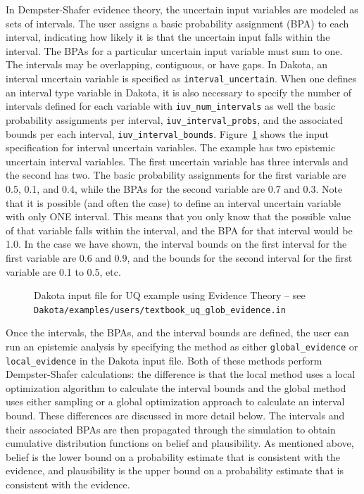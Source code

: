 In Dempster-Shafer evidence theory, the uncertain input variables are
modeled as sets of intervals. The user assigns a basic probability
assignment (BPA) to each interval, indicating how likely it is that
the uncertain input falls within the interval. The BPAs for a
particular uncertain input variable must sum to one. The intervals
may be overlapping, contiguous, or have gaps. In Dakota, an interval
uncertain variable is specified as \texttt{interval\_uncertain}. When
one defines an interval type variable in Dakota, it is also necessary
to specify the number of intervals defined for each variable with
\texttt{iuv\_num\_intervals} as well the basic probability assignments
per interval, \texttt{iuv\_interval\_probs}, and the associated bounds
per each interval, \texttt{iuv\_interval\_bounds}. 
Figure~\ref{uq:figure16} shows the input specification for interval
uncertain variables. 
The example has two epistemic uncertain interval variables. 
The first uncertain
variable has three intervals and the second has two. The basic
probability assignments for the first variable are 0.5, 0.1, and 0.4,
while the BPAs for the second variable are 0.7 and 0.3. Note that it
is possible (and often the case) to define an interval uncertain
variable with only ONE interval. This means that you only know that
the possible value of that variable falls within the interval, and the
BPA for that interval would be 1.0. In the case we have shown, the
interval bounds on the first interval for the first variable are 0.6
and 0.9, and the bounds for the second interval for the first variable
are 0.1 to 0.5, etc.

\begin{figure}[htbp!]
  \centering
  \begin{bigbox}
    \begin{small}
    \end{small}
  \end{bigbox}
\caption{Dakota input file for UQ example using Evidence Theory --
see \texttt{Dakota/examples/users/textbook\_uq\_glob\_evidence.in} }
\label{uq:figure16}
\end{figure}

Once the intervals, the BPAs, and the interval bounds are defined, 
the user can run an epistemic analysis by specifying the method as 
either \texttt{global\_evidence} or 
\texttt{local\_evidence} in the Dakota input file. 
Both of these methods perform Dempster-Shafer calculations:  
the difference is that the local method uses a local optimization 
algorithm to calculate the interval bounds and the global 
method uses either sampling or a global optimization approach to 
calculate an interval bound. These differences are discussed in 
more detail below. 
The intervals and their associated BPAs are then propagated through
the simulation to obtain cumulative distribution functions on belief
and plausibility. As mentioned above, belief is the lower bound on a
probability estimate that is consistent with the evidence, and
plausibility is the upper bound on a probability estimate that is
consistent with the evidence. 

